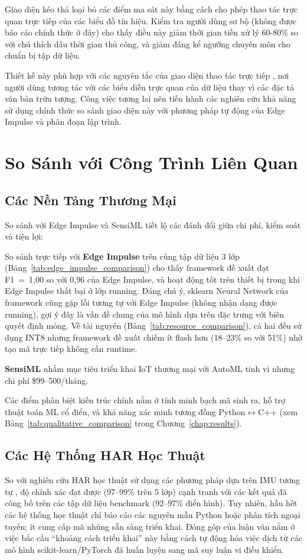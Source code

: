 Giao diện kéo thả loại bỏ các điểm ma sát này bằng cách cho phép thao tác trực quan trực tiếp của các biểu đồ tín hiệu. Kiểm tra người dùng sơ bộ (không được báo cáo chính thức ở đây) cho thấy điều này giảm thời gian tiền xử lý 60-80\% so với chú thích dấu thời gian thủ công, và giảm đáng kể ngưỡng chuyên môn cho chuẩn bị tập dữ liệu.

Thiết kế này phù hợp với các nguyên tắc của giao diện thao tác trực tiếp \cite{shneiderman2016designing}, nơi người dùng tương tác với các biểu diễn trực quan của dữ liệu thay vì các đặc tả văn bản trừu tượng. Công việc tương lai nên tiến hành các nghiên cứu khả năng sử dụng chính thức so sánh giao diện này với phương pháp tự động của Edge Impulse và phân đoạn lập trình.

\section{So Sánh với Công Trình Liên Quan}

\subsection{Các Nền Tảng Thương Mại}
So sánh với Edge Impulse và SensiML tiết lộ các đánh đổi giữa chi phí, kiểm soát và tiện lợi:

So sánh trực tiếp với \textbf{Edge Impulse} trên cùng tập dữ liệu 3 lớp (Bảng~\ref{tab:edge_impulse_comparison}) cho thấy framework đề xuất đạt F1~=~1,00 so với 0,96 của Edge Impulse, và hoạt động tốt trên thiết bị trong khi Edge Impulse thất bại ở lớp running. Đáng chú ý, sklearn Neural Network của framework cũng gặp lỗi tương tự với Edge Impulse (không nhận dạng được running), gợi ý đây là vấn đề chung của mô hình dựa trên đặc trưng với biên quyết định mỏng. Về tài nguyên (Bảng~\ref{tab:resource_comparison}), cả hai đều sử dụng INT8 nhưng framework đề xuất chiếm ít flash hơn (18--23\% so với 51\%) nhờ tạo mã trực tiếp không cần runtime.

\textbf{SensiML} nhắm mục tiêu triển khai IoT thương mại với AutoML tinh vi nhưng chi phí \$99--500/tháng.

Các điểm phân biệt kiến trúc chính nằm ở tính minh bạch mã sinh ra, hỗ trợ thuật toán ML cổ điển, và khả năng xác minh tương đồng Python$\leftrightarrow$C++ (xem Bảng~\ref{tab:qualitative_comparison} trong Chương~\ref{chap:results}).

\subsection{Các Hệ Thống HAR Học Thuật}
So với nghiên cứu HAR học thuật sử dụng các phương pháp dựa trên IMU tương tự \cite{anguita2013har}, độ chính xác đạt được (97--99\% trên 5 lớp) cạnh tranh với các kết quả đã công bố trên các tập dữ liệu benchmark (92--97\% điển hình). Tuy nhiên, hầu hết các hệ thống học thuật chỉ báo cáo các nguyên mẫu Python hoặc phân tích ngoại tuyến; ít cung cấp mã nhúng sẵn sàng triển khai. Đóng góp của luận văn nằm ở việc bắc cầu ``khoảng cách triển khai'' này bằng cách tự động hóa việc dịch từ các mô hình scikit-learn/PyTorch đã huấn luyện sang mã suy luận vi điều khiển.

